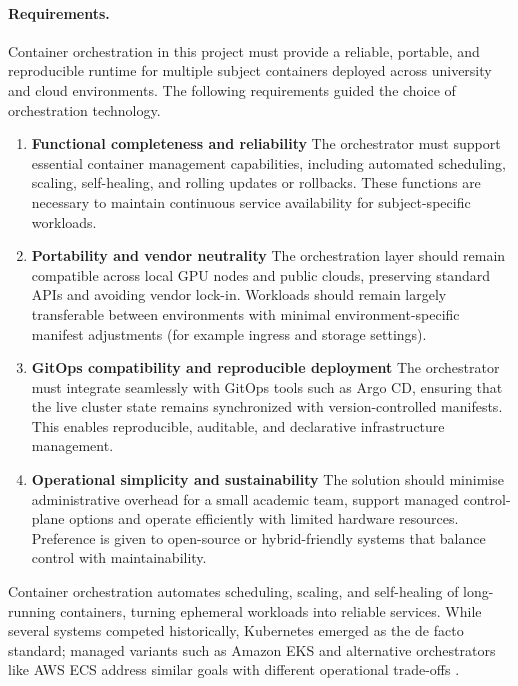 \paragraph{Requirements.}
Container orchestration in this project must provide a reliable, portable, and reproducible runtime for multiple subject containers deployed across university and cloud environments. The following requirements guided the choice of orchestration technology.

\begin{enumerate}
    \item \textbf{Functional completeness and reliability}
    The orchestrator must support essential container management capabilities, including automated scheduling, scaling, self-healing, and rolling updates or rollbacks. These functions are necessary to maintain continuous service availability for subject-specific workloads.

    \item \textbf{Portability and vendor neutrality}  
    The orchestration layer should remain compatible across local GPU nodes and public clouds, preserving standard APIs and avoiding vendor lock-in. Workloads should remain largely transferable between environments with minimal environment-specific manifest adjustments (for example ingress and storage settings).

    \item \textbf{GitOps compatibility and reproducible deployment}  
    The orchestrator must integrate seamlessly with GitOps tools such as Argo CD, ensuring that the live cluster state remains synchronized with version-controlled manifests. This enables reproducible, auditable, and declarative infrastructure management.

    \item \textbf{Operational simplicity and sustainability}  
    The solution should minimise administrative overhead for a small academic team, support managed control-plane options and operate efficiently with limited hardware resources. Preference is given to open-source or hybrid-friendly systems that balance control with maintainability.
\end{enumerate}

Container orchestration automates scheduling, scaling, and self-healing of long-running containers, turning ephemeral workloads into reliable services. While several systems competed historically, Kubernetes emerged as the de facto standard; managed variants such as Amazon EKS and alternative orchestrators like AWS ECS address similar goals with different operational trade-offs \parencite{Kubernet98:online,Kubernet67:online,RunConta17:online,Swarmmod44:online}.

